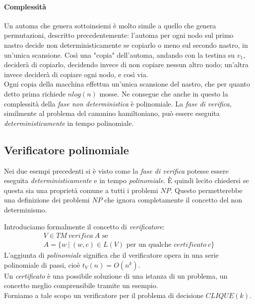\paragraph{Complessità}

Un automa che genera sottoinsiemi è molto simile a quello che genera permutazioni, descritto precedentemente: l'automa per ogni nodo sul primo nastro decide non deterministicamente se copiarlo o meno sul secondo nastro, in un'unica scansione. Così una "copia" dell'automa, andando con la testina su $v_1$, deciderà di copiarlo, decidendo invece di non copiare nessun altro nodo; un'altra invece deciderà di copiare ogni nodo, e così via.
\\

Ogni copia della macchina effettua un'unica scansione del nastro, che per quanto detto prima richiede $nlog(n)$ mosse. Ne consegue che anche in questo la complessità della \emph{fase non deterministica} è polinomiale. La \emph{fase di verifica}, similmente al problema del cammino hamiltoniano, può essere eseguita \emph{deterministicamente} in tempo polinomiale. 

\subsection{Verificatore polinomiale}

Nei due esempi precedenti si è visto come la \emph{fase di verifica} potesse essere eseguita \emph{deterministicamente} e in tempo \emph{polinomiale}. È quindi lecito chiedersi se questa sia una proprietà comune a tutti i problemi $NP$. Questo permetterebbe una definizione dei problemi $NP$ che ignora completamente il concetto del non determinismo. 

Introduciamo formalmente il concetto di \emph{verificatore}:
\begin{gather*}
	V \in TM \ verifica \ A \text{ se} \\
	A = \{ w \ | \ (w, c) \in L(V) \text{ per un qualche } certificato \ c \}
\end{gather*}
L'aggiunta di \emph{polinomiale} significa che il verificatore opera in una serie polinomiale di passi, cioè $t_V(n) = O(n^k)$.\\
Un \emph{certificato} è una possibile soluzione di una istanza di un problema, un concetto meglio comprensibile tramite un esempio. 
\\
Forniamo a tale scopo un verificatore per il problema di decisione $CLIQUE(k)$.
\\

